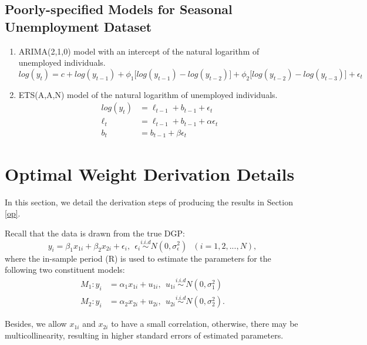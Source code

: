 \documentclass{monashthesis}
\begin{document}
\hypertarget{poorly-specified-models-for-seasonal-unemployment-dataset}{%
\subsection{Poorly-specified Models for Seasonal Unemployment Dataset}\label{poorly-specified-models-for-seasonal-unemployment-dataset}}

\begin{enumerate}
\def\labelenumi{\arabic{enumi}.}
\item
  ARIMA(2,1,0) model with an intercept of the natural logarithm of unemployed individuals.
  \begin{equation*}
  log(y_t) = c + log(y_{t-1}) + \phi_1\big[log(y_{t-1})-log(y_{t-2})\big] + \phi_2\big[log(y_{t-2})-log(y_{t-3})\big] + \epsilon_t
  \end{equation*}
\item
  ETS(A,A,N) model of the natural logarithm of unemployed individuals.
  \begin{align*}
  log(y_t) &= \ell_{t-1} + b_{t-1} + \epsilon_t \\
  \ell_t &= \ell_{t-1} + b_{t-1} + \alpha \epsilon_t \\
  b_t &= b_{t-1} + \beta \epsilon_t
  \end{align*}
\end{enumerate}

\hypertarget{detail}{%
\section{Optimal Weight Derivation Details}\label{detail}}

In this section, we detail the derivation steps of producing the results in Section \ref{op}.

Recall that the data is drawn from the true DGP:
\[y_i = \beta_1 x_{1i} + \beta_2 x_{2i} + \epsilon_i, \ \ \epsilon_i \stackrel{i.i.d}{\sim} N(0,\sigma^2_{\epsilon}) \ \ \ (i = 1,2,...,N),\]
where the in-sample period (R) is used to estimate the parameters for the following two constituent models:
\begin{align*}
M_1: y_i &= \alpha_1 x_{1i} + u_{1i}, \ \ u_{1i} \stackrel{i.i.d}{\sim} N(0,\sigma^2_1) \\
M_2: y_i &= \alpha_2 x_{2i} + u_{2i}, \ \ u_{2i} \stackrel{i.i.d}{\sim} N(0,\sigma^2_2).
\end{align*}

Besides, we allow \(x_{1i}\) and \(x_{2i}\) to have a small correlation, otherwise, there may be multicollinearity, resulting in higher standard errors of estimated parameters.
\end{document}
